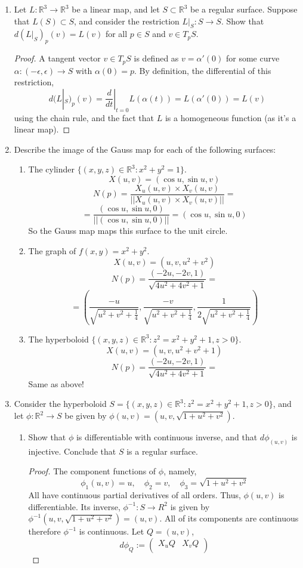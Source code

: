 \documentclass[a4paper,17pt]{extarticle}
\title{\scalebox{2}{Math 553 Exam 2}}
\author{\scalebox{1.5}{Theo Koss}}
\date{April 2022}
\theoremstyle{definition}
\newcommand{\R}{\mathbb{R}}
\begin{document}
\maketitle
\begin{enumerate}
\item Let $L:\R^3\to\R^3$ be a linear map, and let $S\subset\R^3$ be a regular surface. Suppose that $L(S)\subset S$, and consider the restriction $L|_S:S\to S$. Show that $d(L|_S)_p(v)=L(v)$ for all $p\in S$ and $v\in T_pS$. \begin{proof} A tangent vector $v\in T_pS$ is defined as $v=\alpha'(0)$ for some curve $\alpha:(-\epsilon,\epsilon)\to S$ with $\alpha(0)=p$. By definition, the differential of this restriction, $$d(L|_S)_p(v)=\frac{d}{dt}|_{t=0}L(\alpha(t))=L(\alpha'(0))=L(v)$$ using the chain rule, and the fact that $L$ is  a homogeneous function (as it's a linear map). 
\end{proof}
\item Describe the image of the Gauss map for each of the following surfaces:
    \begin{enumerate}[label=(\alph*).]
    \item The cylinder $\{(x,y,z)\in\R^3:x^2+y^2=1\}$.
    $$X(u,v)=(\cos u,\sin u,v)$$ $$N(p)=\frac{X_u(u,v)\times X_v(u,v)}{||X_u(u,v)\times X_v(u,v)||}=$$ $$=\frac{(\cos u,\sin u,0)}{||(\cos u,\sin u,0)||}=(\cos u,\sin u,0)$$ So the Gauss map maps this surface to the unit circle.
    \item The graph of $f(x,y)=x^2+y^2$.  $$X(u,v)=(u,v,u^2+v^2)$$ $$N(p)=\frac{(-2u,-2v,1)}{\sqrt{4u^2+4v^2+1}}=$$ $$=\left(\frac{-u}{\sqrt{u^2+v^2+\frac{1}{4}}},\frac{-v}{\sqrt{u^2+v^2+\frac{1}{4}}},\frac{1}{2\sqrt{u^2+v^2+\frac{1}{4}}}\right)$$
    \item The hyperboloid $\{(x,y,z)\in\R^3:z^2=x^2+y^2+1,z>0\}$. $$X(u,v)=(u,v,u^2+v^2+1)$$ $$N(p)=\frac{(-2u,-2v,1)}{\sqrt{4u^2+4v^2+1}}=$$ Same as above!
    \end{enumerate}
\item Consider the hyperboloid $S=\{(x,y,z)\in\R^3:z^2=x^2+y^2+1,z>0\}$, and let $\phi:\R^2\to S$ be given by $\phi(u,v)=(u,v,\sqrt{1+u^2+v^2})$.\begin{enumerate}[label=(\alph*).]
    \item Show that $\phi$ is differentiable with continuous inverse, and that $d\phi_{(u,v)}$ is injective. Conclude that $S$ is a regular surface.\begin{proof} The component functions of $\phi$, namely, $$\phi_1(u,v)=u,\quad \phi_2=v,\quad\phi_3=\sqrt{1+u^2+v^2}$$ All have continuous partial derivatives of all orders. Thus, $\phi(u,v)$ is differentiable. Its inverse, $\phi^{-1}:S\to R^2$ is given by $\phi^{-1}(u,v,\sqrt{1+u^2+v^2})=(u,v)$. All of its components are continuous therefore $\phi^{-1}$ is continuous. Let $Q=(u,v)$, $$d\phi_Q:=\begin{pmatrix}X_uQ& X_vQ\\

\end{pmatrix}$$
\end{proof}
\end{enumerate}
\end{enumerate}
\end{document}
